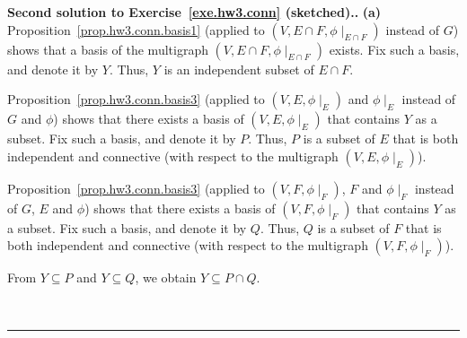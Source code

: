 \documentclass[numbers=enddot,12pt,final,onecolumn,notitlepage]{scrartcl}%
\theoremstyle{definition}
\newenvironment{proof}[1][Proof]{\noindent\textbf{#1.} }{\ \rule{0.5em}{0.5em}}
\newcommand{\tup}[1]{\left( #1 \right)}
\begin{document}
\begin{proof}[Second solution to Exercise~\ref{exe.hw3.conn}
 (sketched).]
\textbf{(a)}
Proposition~\ref{prop.hw3.conn.basis1} (applied to
$\tup{V, E \cap F, \phi\mid_{E \cap F}}$ instead of $G$)
shows that a basis of the multigraph
$\tup{V, E \cap F, \phi\mid_{E \cap F}}$ exists.
Fix such a basis, and denote it by $Y$.
Thus, $Y$ is an independent subset of $E \cap F$.

Proposition~\ref{prop.hw3.conn.basis3} (applied to
$\tup{V, E, \phi\mid_E}$ and $\phi\mid_E$ instead of
$G$ and $\phi$) shows that there exists a basis of
$\tup{V, E, \phi\mid_E}$ that contains $Y$ as a subset.
Fix such a basis, and denote it by $P$.
Thus, $P$ is a subset of $E$ that is both independent and
connective (with respect to the multigraph
$\tup{V, E, \phi\mid_E}$).

Proposition~\ref{prop.hw3.conn.basis3} (applied to
$\tup{V, F, \phi\mid_F}$, $F$ and $\phi\mid_F$ instead of
$G$, $E$ and $\phi$) shows that there exists a basis of
$\tup{V, F, \phi\mid_F}$ that contains $Y$ as a subset.
Fix such a basis, and denote it by $Q$.
Thus, $Q$ is a subset of $F$ that is both independent and
connective (with respect to the multigraph
$\tup{V, F, \phi\mid_F}$).

From $Y \subseteq P$ and $Y \subseteq Q$, we obtain
$Y \subseteq P \cap Q$.


\end{proof}
\end{document}
